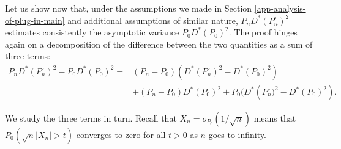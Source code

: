 \documentclass[
  11pt,
  openright,twoside]{book}
\newcommand{\Phat}{P^{\circ}}
\theoremstyle{definition}
\theoremstyle{definition}
\theoremstyle{definition}
\theoremstyle{definition}
\theoremstyle{remark}
\begin{document}
Let us show now that, under the assumptions we made in Section
\ref{app-analysis-of-plug-in-main} and additional assumptions of similar
nature, \(P_{n} D^{*} (\Phat_n)^2\) estimates consistently the asymptotic
variance \(P_{0} D^{*} (P_{0})^2\). The proof hinges again on a decomposition
of the difference between the two quantities as a sum of three terms:
\begin{align}  P_{n} D^{*}  (\Phat_n)^2 -  P_{0} D^{*}  (P_{0})^2= &  (P_{n} -
P_{0}) \left(D^{*} (\Phat_n)^2 - D^{*}  (P_{0})^2\right)\\ & + (P_{n} - P_{0})
D^{*}  (P_{0})^2 +  P_{0}  (D^{*} \left(\Phat_n)^2  - D^{*}  (P_{0})^2\right).
\end{align}

We study the three terms in turn. Recall that \(X_n = o_{P_0}(1/\sqrt{n})\)
means that \(P_0(\sqrt{n}|X_n| > t)\) converges to zero for all \(t>0\) as \(n\)
goes to infinity.
\end{document}
